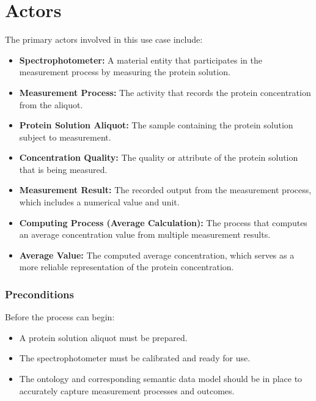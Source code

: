 \section{Actors}
The primary actors involved in this use case include:
\begin{itemize}[noitemsep]
    \item \textbf{Spectrophotometer:} A material entity that participates in the measurement process by measuring the protein solution.
    \item \textbf{Measurement Process:} The activity that records the protein concentration from the aliquot.
    \item \textbf{Protein Solution Aliquot:} The sample containing the protein solution subject to measurement.
    \item \textbf{Concentration Quality:} The quality or attribute of the protein solution that is being measured.
    \item \textbf{Measurement Result:} The recorded output from the measurement process, which includes a numerical value and unit.
    \item \textbf{Computing Process (Average Calculation):} The process that computes an average concentration value from multiple measurement results.
    \item \textbf{Average Value:} The computed average concentration, which serves as a more reliable representation of the protein concentration.
\end{itemize}

\subsubsection{Preconditions}
Before the process can begin:
\begin{itemize}[noitemsep]
    \item A protein solution aliquot must be prepared.
    \item The spectrophotometer must be calibrated and ready for use.
    \item The ontology and corresponding semantic data model should be in place to accurately capture measurement processes and outcomes.
\end{itemize}

